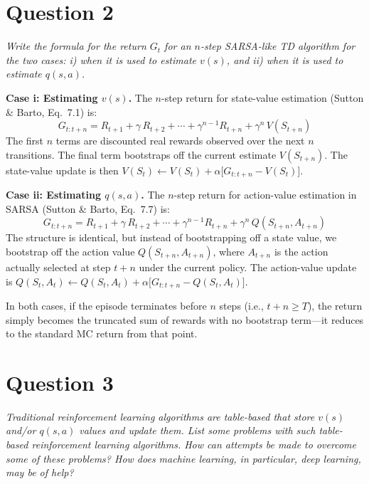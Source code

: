 \documentclass[letterpaper]{article}
\begin{document}
\section*{Question 2}
\textit{Write the formula for the return $G_t$ for an $n$-step SARSA-like TD algorithm for the two cases: i) when it is used to estimate $v(s)$, and ii) when it is used to estimate $q(s,a)$.}

\vspace{0.5em}

\noindent\textbf{Case i: Estimating $v(s)$.} The $n$-step return for state-value estimation (Sutton \& Barto, Eq.~7.1) is:
\begin{equation}
G_{t:t+n} = R_{t+1} + \gamma\, R_{t+2} + \cdots + \gamma^{n-1} R_{t+n} + \gamma^{n}\, V(S_{t+n})
\end{equation}
The first $n$ terms are discounted real rewards observed over the next $n$ transitions. The final term bootstraps off the current estimate $V(S_{t+n})$. The state-value update is then $V(S_t) \leftarrow V(S_t) + \alpha\bigl[G_{t:t+n} - V(S_t)\bigr]$.

\vspace{0.5em}
\noindent\textbf{Case ii: Estimating $q(s,a)$.} The $n$-step return for action-value estimation in SARSA (Sutton \& Barto, Eq.~7.7) is:
\begin{equation}
G_{t:t+n} = R_{t+1} + \gamma\, R_{t+2} + \cdots + \gamma^{n-1} R_{t+n} + \gamma^{n}\, Q(S_{t+n}, A_{t+n})
\end{equation}
The structure is identical, but instead of bootstrapping off a state value, we bootstrap off the action value $Q(S_{t+n}, A_{t+n})$, where $A_{t+n}$ is the action actually selected at step $t+n$ under the current policy. The action-value update is $Q(S_t, A_t) \leftarrow Q(S_t, A_t) + \alpha\bigl[G_{t:t+n} - Q(S_t, A_t)\bigr]$.

In both cases, if the episode terminates before $n$ steps (i.e., $t + n \geq T$), the return simply becomes the truncated sum of rewards with no bootstrap term---it reduces to the standard MC return from that point.

\section*{Question 3}
\textit{Traditional reinforcement learning algorithms are table-based that store $v(s)$ and/or $q(s,a)$ values and update them. List some problems with such table-based reinforcement learning algorithms. How can attempts be made to overcome some of these problems? How does machine learning, in particular, deep learning, may be of help?}
\end{document}
